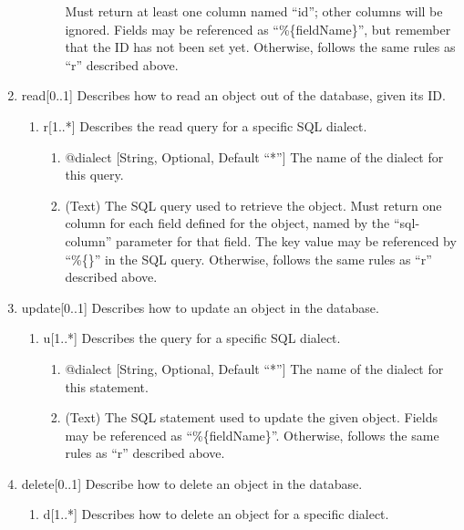 \documentclass{book}
\begin{document}
\begin{enumerate}
\begin{enumerate}
\begin{enumerate}
                  Must return at least one column named ``id''; other columns
                  will be ignored. Fields may be referenced as
                  ``\%\{fieldName\}'', but remember that the ID has not been set
                  yet. Otherwise, follows the same rules as ``r'' described above.
        \end{enumerate}
    \end{enumerate}
    \item read[0..1] Describes how to read an object out of the database, given
          its ID.
    \begin{enumerate}
        \item r[1..*] Describes the read query for a specific SQL dialect.
            \begin{enumerate}
            \item @dialect [String, Optional, Default ``*''] The name of the
                  dialect for this query.
            \item (Text) The SQL query used to retrieve the object. Must return
                  one column for each field defined for the object, named by the
                  ``sql-column'' parameter for that field. The key value may be
                  referenced by ``\%\{\}'' in the SQL query. Otherwise, follows
                  the same rules as ``r'' described above.
        \end{enumerate}
    \end{enumerate}
    \item update[0..1] Describes how to update an object in the database.
    \begin{enumerate}
        \item u[1..*] Describes the query for a specific SQL dialect.
        \begin{enumerate}
            \item @dialect [String, Optional, Default ``*''] The name of the
                  dialect for this statement.
            \item (Text) The SQL statement used to update the given object.
                  Fields may be referenced as ``\%\{fieldName\}''. Otherwise,
                  follows the same rules as ``r'' described above.
        \end{enumerate}
    \end{enumerate}
    \item delete[0..1] Describe how to delete an object in the database.
    \begin{enumerate}
        \item d[1..*] Describes how to delete an object for a specific dialect.

\end{enumerate}
\end{enumerate}
\end{document}
